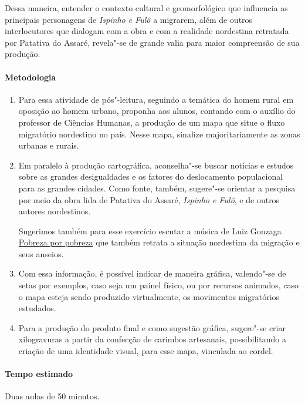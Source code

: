 \documentclass[12pt]{extarticle}
\begin{document}
Dessa maneira, entender o contexto cultural e geomorfológico que influencia 
as principais personagens de \emph{Ispinho e Fulô} a migrarem, além de 
outros interlocutores que dialogam com a obra e com a realidade nordestina 
retratada por Patativa do Assaré, revela"-se de grande valia para maior 
compreensão de sua produção.

\paragraph{Metodologia}

\begin{enumerate}
\item
Para essa atividade de pós"-leitura, seguindo a temática do homem rural 
em oposição ao homem urbano, proponha aos alunos, contando com o auxílio 
do professor de Ciências Humanas, a produção de um mapa que situe o fluxo 
migratório nordestino no país. Nesse mapa, sinalize majoritariamente as 
zonas urbanas e rurais. 

\item
Em paralelo à produção cartográfica, aconselha"-se buscar notícias e 
estudos sobre as grandes desigualdades e os fatores do deslocamento 
populacional para as grandes cidades. Como fonte, também, sugere"-se 
orientar a pesquisa por meio da obra lida de Patativa do Assaré, 
\emph{Ispinho e Fulô}, e de outros autores nordestinos.

Sugerimos também para esse exercício escutar a música de Luiz Gonzaga \href{https://www.youtube.com/watch?v=L9WSaMi2QhA&ab_channel=LuizGonzaga-Topic}{Pobreza por pobreza} que também retrata a situação nordestina da migração e seus 
anseios. 

\item
Com essa informação, é possível indicar de maneira gráfica, valendo"-se 
de setas por exemplos,
caso seja um painel físico, ou por recursos animados, caso o mapa esteja
sendo produzido virtualmente, os movimentos migratórios estudados. 

\item
Para a produção do produto final e como sugestão gráfica, sugere"-se criar xilogravuras a partir da confecção de carimbos artesanais, possibilitando 
a criação de uma identidade visual, para esse mapa, vinculada ao cordel.

\end{enumerate}

\paragraph{Tempo estimado} Duas aulas de 50 minutos. 
\end{document}
